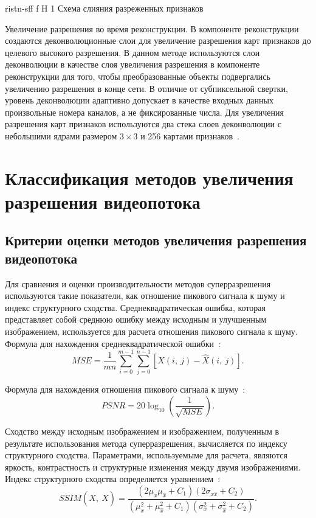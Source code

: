 \documentclass{bmstu}
\begin{document}
    {ristn-sff}
    {f}
    {H}
    {1\textwidth}
    {Схема слияния разреженных признаков~\cite{Xiaobin2019}}

Увеличение разрешения во время реконструкции. 
В компоненте реконструкции создаются деконволюционные слои для увеличение разрешения карт признаков до целевого высокого разрешения. 
В данном методе используются слои деконволюции в качестве слоя увеличения разрешения в компоненте реконструкции для того, чтобы преобразованные объекты подвергались увеличению разрешения в конце сети. 
В отличие от субпиксельной свертки, уровень деконволюции адаптивно допускает в качестве входных данных произвольные номера каналов, а не фиксированные числа. 
Для увеличения разрешения карт признаков используются два стека слоев деконволюции с небольшими ядрами размером $3 \times 3$ и 256 картами признаков~\cite{Xiaobin2019}.

\chapter{Классификация методов увеличения разрешения видеопотока}

\section{Критерии оценки методов увеличения разрешения видеопотока}

Для сравнения и оценки производительности методов суперразрешения используются такие показатели, как отношение пикового сигнала к шуму и индекс структурного сходства. 
Среднеквадратическая ошибка, которая представляет собой среднюю ошибку между исходным и улучшенным изображением, используется для расчета отношения пикового сигнала к шуму. 
Формула для нахождения среднеквадратической ошибки~\cite{Daithankar2021}:
\begin{equation}
MSE = \frac{1}{mn} \sum_{i = 0}^{m - 1} \sum_{j = 0}^{n - 1} [X(i,~j) - \hat{X}(i,~j)].
\end{equation}

Формула для нахождения отношения пикового сигнала к шуму~\cite{Daithankar2021}:
\begin{equation}
PSNR = 20 \log_{10}(\frac{1}{\sqrt{MSE}}).
\end{equation}

Сходство между исходным изображением и изображением, полученным в результате использования метода суперразрешения, вычисляется по индексу структурного сходства. 
Параметрами, используемыме для расчета, являются яркость, контрастность и структурные изменения между двумя изображениями. 
Индекс структурного сходства определяется уравнением~\cite{Daithankar2021}:
\begin{equation}
SSIM(X,~\hat{X}) = \frac{(2 \mu_x \mu_{\hat{x}} + C_1)(2 \sigma_{x \hat{x}} + C_2)}{(\mu_x^2 + \mu_{\hat{x}}^2 + C_1)(\sigma_x^2 + \sigma_{\hat{x}}^2 + C_2)}.
\end{equation}
\end{document}
